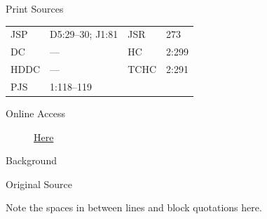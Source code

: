 			\begin{description}
				\item[Print Sources]
			\end{description}

				\begin{tabular}{p{0.5in}p{1in}p{0.5in}p{1in}}
				JSP	 	& D5:29--30; J1:81		& JSR 	& 273 \\
				DC	 	& --- 			& HC 	& 2:299 \\
				HDDC 	& ---			& TCHC 	& 2:291 \\
				PJS 	& 1:118--119			& 	 		&  \\
				\end{tabular}
			
			\begin{description}
				\item[Online Access] \href{https://www.josephsmithpapers.org/paper-summary/revelation-1-november-1835/1}{Here}
			\end{description}
			
			\begin{description}
				\item[Background]
			\end{description}
			
			
			\begin{description}
				\item[Original Source]
			\end{description}
			
				
				Note the spaces in between lines and block quotations here.
			
